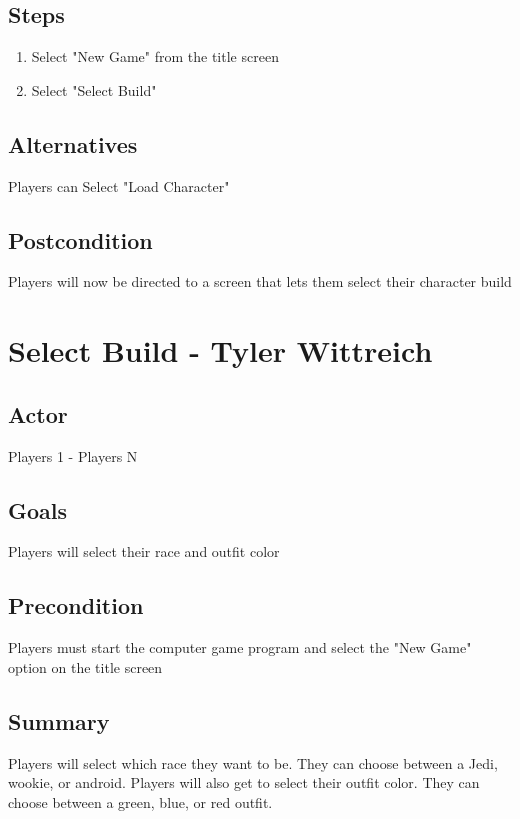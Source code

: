 \documentclass[10pt]{article}
\begin{document}
        \subsection{Steps}
			 \begin{enumerate}
			      \item Select "New Game" from the title screen
			      \item Select "Select Build"
			 \end{enumerate}
			
			
		\subsection{Alternatives}
			Players can Select "Load Character" 
			
		\subsection{Postcondition}
			Players will now be directed to a screen that lets them select their character build 








\newpage








\section{Select Build - Tyler Wittreich}

		\subsection{Actor}
		Players 1 - Players N
		
		
		\subsection{Goals}
 		Players will select their race and  outfit color

		\subsection{Precondition}
 		Players must start the computer game program and select the "New Game" option on the title screen

		\subsection{Summary}
			Players will select which race they want to be. They can choose between a Jedi, wookie, or android. Players will also get to select their outfit color. They can choose between a green, blue, or red outfit. 
\end{document}
